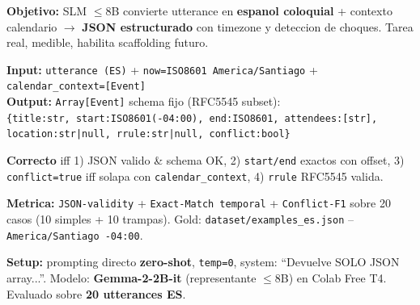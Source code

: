 \documentclass[a4paper,10pt]{article}
\begin{document}
\begin{multicols}{2}

\begin{tcolorbox}[colback=white,colframe=agendaAccent,arc=2pt,boxrule=0.7pt,title={\bfseries\small 1. Task Specification \quad {\normalfont\scriptsize(10 pts)}},fonttitle=\color{white},colbacktitle=agendaAccent,left=3pt,right=3pt,top=2pt,bottom=3pt]
\scriptsize
\textbf{Objetivo:} SLM $\leq$8B convierte utterance en \textbf{espanol coloquial} + contexto calendario $\rightarrow$ \textbf{JSON estructurado} con timezone y deteccion de choques. Tarea real, medible, habilita scaffolding futuro.

\textbf{Input:} \texttt{utterance (ES)} + \texttt{now=ISO8601 America/Santiago} + \texttt{calendar\_context=[Event]}\\
\textbf{Output:} \texttt{Array[Event]} schema fijo (RFC5545 subset):\\
\texttt{\{title:str, start:ISO8601(-04:00), end:ISO8601, attendees:[str], location:str|null, rrule:str|null, conflict:bool\}}

\textbf{Correcto} iff 1) JSON valido \& schema OK, 2) \texttt{start/end} exactos con offset, 3) \texttt{conflict=true} iff solapa con \texttt{calendar\_context}, 4) \texttt{rrule} RFC5545 valida.

\vspace{3pt}
\vspace{3pt}

\textbf{Metrica:} \texttt{JSON-validity} + \texttt{Exact-Match temporal} + \texttt{Conflict-F1} sobre 20 casos (10 simples + 10 trampas). Gold: \texttt{dataset/examples\_es.json} -- \texttt{America/Santiago -04:00}.
\end{tcolorbox}

\begin{tcolorbox}[colback=white,colframe=warnRed,arc=2pt,boxrule=0.7pt,title={\bfseries\small 2. Failure Diagnosis \quad {\normalfont\scriptsize(10 pts -- evidencia)}},fonttitle=\color{white},colbacktitle=warnRed,left=3pt,right=3pt,top=2pt,bottom=3pt]
\scriptsize
\textbf{Setup:} prompting directo \textbf{zero-shot}, \texttt{temp=0}, system: ``Devuelve SOLO JSON array...''. Modelo: \textbf{Gemma-2-2B-it} (representante $\leq$8B) en Colab Free T4. Evaluado sobre \textbf{20 utterances ES}.


\end{tcolorbox}
\end{multicols}
\end{document}
